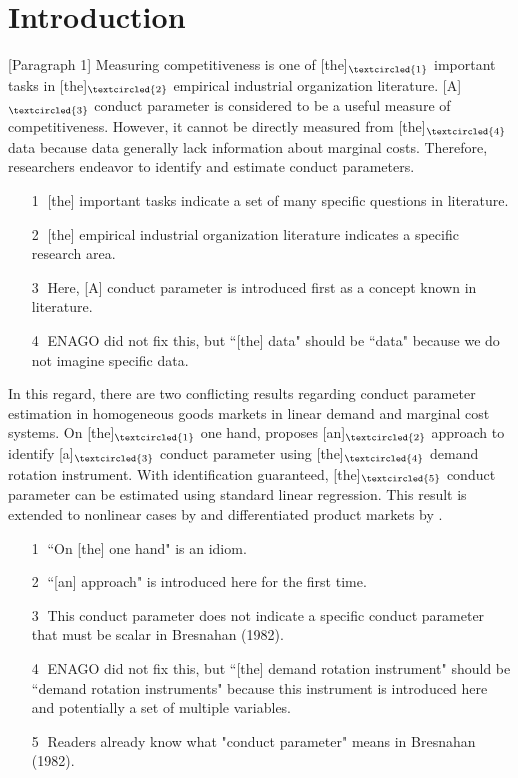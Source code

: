 \documentclass[11pt, a4paper]{article}
\begin{document}
\newpage
\section{Introduction}
[Paragraph 1]
Measuring competitiveness is one of [the]$_{\textcircled{1}}$  important tasks in [the]$_{\textcircled{2}}$  empirical industrial organization literature.
[A]$_{\textcircled{3}}$ conduct parameter is considered to be a useful measure of competitiveness. 
However, it cannot be directly measured from [the]$_{\textcircled{4}}$  data because data generally lack information about marginal costs.
Therefore, researchers endeavor to identify and estimate conduct parameters.


\begin{itemize}
    \item[\textcircled{1}]  [the] important tasks indicate a set of many specific questions in literature.  
    \item[\textcircled{2}] [the] empirical industrial organization literature indicates a specific research area.
    \item[\textcircled{3}]  Here, [A] conduct parameter is introduced first as a concept known in literature.
    \item[\textcircled{4}] ENAGO did not fix this, but ``[the] data" should be ``data" because we do not imagine specific data.
\end{itemize}

\newpage
[Paragraph 2]

In this regard, there are two conflicting results regarding conduct parameter estimation in homogeneous goods markets in linear demand and marginal cost systems.
On [the]$_{\textcircled{1}}$ one hand, \citet{bresnahan1982oligopoly} proposes [an]$_{\textcircled{2}}$ approach to identify [a]$_{\textcircled{3}}$ conduct parameter using [the]$_{\textcircled{4}}$ demand rotation instrument.
With identification guaranteed, [the]$_{\textcircled{5}}$ conduct parameter can be estimated using standard linear regression.
This result is extended to nonlinear cases by \citet{lau1982identifying} and differentiated product markets by \citet{nevoIdentificationOligopolySolution1998}.



\begin{itemize}
    \item[\textcircled{1}] ``On [the] one hand" is an idiom. 
    \item[\textcircled{2}] ``[an] approach" is introduced here for the first time.
    \item[\textcircled{3}] This conduct parameter does not indicate a specific conduct parameter that must be scalar in Bresnahan (1982).
    \item[\textcircled{4}] ENAGO did not fix this, but ``[the] demand rotation instrument" should be ``demand rotation instruments" because this instrument is introduced here and potentially a set of multiple variables.
    \item[\textcircled{5}] Readers already know what "conduct parameter" means in Bresnahan (1982).
\end{itemize}
\end{document}
